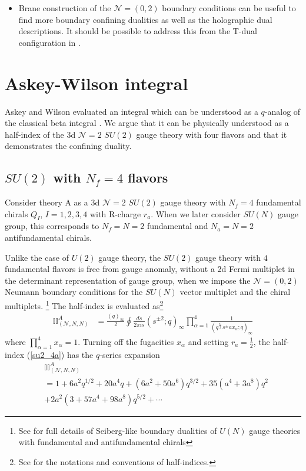 \documentclass[12pt]{article}
\numberwithin{equation}{section}
\begin{document}
\begin{itemize}
    \item Brane construction of the $\mathcal{N}=(0,2)$ boundary conditions can be useful 
    to find more boundary confining dualities as well as the holographic dual descriptions. It should be possible to address this from the T-dual configuration in \cite{Okazaki:2020pbb}. 
\end{itemize}


\section{Askey-Wilson integral}
\label{sec_Askey_Wilson}
Askey and Wilson evaluated an integral which can be understood as a $q$-analog of the classical beta integral \cite{MR783216}. We argue that it can be physically understood as a half-index of the 3d $\mathcal{N}=2$ $SU(2)$ gauge theory with four flavors and that it demonstrates the confining duality. 

\subsection{$SU(2)$ with $N_f = 4$ flavors}
\label{sec_su2nf2na2}
Consider theory A as a 3d $\mathcal{N}=2$ $SU(2)$ gauge theory with 
$N_f=4$ fundamental chirals $Q_I$, $I=1,2,3,4$ with R-charge $r_a$. When we later consider $SU(N)$ gauge group, 
this corresponds to $N_f = N = 2$ fundamental and $N_a = N = 2$ antifundamental chirals.

Unlike the case of $U(2)$ gauge theory, 
the $SU(2)$ gauge theory with $4$ fundamental flavors is free from gauge anomaly, without a 2d Fermi multiplet in the determinant representation of gauge group,
when we impose the $\mathcal{N}=(0,2)$ Neumann boundary conditions for the $SU(N)$ vector multiplet and the chiral multiplets. \footnote{See \cite{Dimofte:2017tpi} for full details of Seiberg-like boundary dualities of $U(N)$ gauge theories with fundamental and antifundamental chirals}  
The half-index is evaluated as\footnote{
See \cite{Okazaki:2021pnc,Okazaki:2021gkk} for the notations and conventions of half-indices. 
}
\begin{align}
\label{su2_4a}
\mathbb{II}^{A}_{(\mathcal{N},N,N)}
&=\frac{(q)_{\infty}}{2}
\oint \frac{ds}{2\pi is}
(s^{\pm2};q)_{\infty}
\prod_{\alpha=1}^{4}
\frac{1}{(q^{\frac{r_a}{2}} s^{\pm} a x_{\alpha};q)_{\infty}}
\end{align}
where $\prod_{\alpha = 1}^4 x_{\alpha} = 1$. 
Turning off the fugacities $x_{\alpha}$ and setting $r_a=\frac12$, 
the half-index (\ref{su2_4a}) has the $q$-series expansion 
\begin{align}
&\mathbb{II}^{A}_{(\mathcal{N},N,N)}
\nonumber\\
&=1+6a^2q^{1/2}
+20a^4q+(6a^2+50a^6)q^{3/2}+35(a^4+3 a^8)q^2
\nonumber\\
&+2a^2(3+57a^4+98a^8)q^{5/2}
+\cdots
\end{align}
\end{document}
